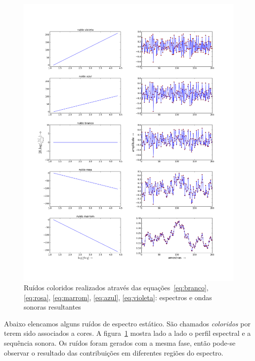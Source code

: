 \begin{figure}[htpq!]
    \centering
        \includegraphics[width=\textwidth]{figuras/ruidos___}
    \caption{Ruídos coloridos realizados através das equações~\ref{eq:branco}, \ref{eq:rosa}, \ref{eq:marrom}, \ref{eq:azul}, \ref{eq:violeta}: espectros e ondas sonoras resultantes}
        \label{fig:ruidos}
\end{figure}


Abaixo elencamos alguns ruídos de espectro estático. São chamados \emph{coloridos} por terem sido associados a cores. 
A figura~\ref{fig:ruidos} mostra lado a lado o perfil espectral e
a sequência sonora. Os ruídos foram gerados com a mesma fase, então
pode-se observar o resultado das contribuições em diferentes regiões do espectro.

